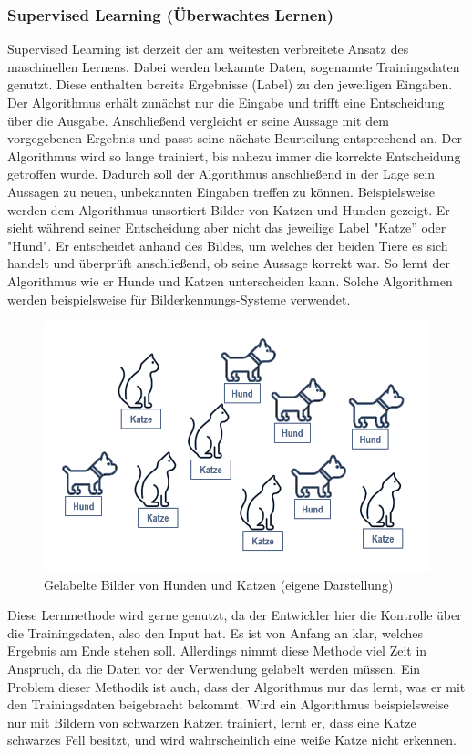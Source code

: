 \documentclass[a4paper,12pt, german]{report}
\begin{document}
\subsubsection{Supervised Learning (Überwachtes Lernen)} 

Supervised Learning ist derzeit der am weitesten verbreitete Ansatz des maschinellen Lernens. Dabei werden bekannte Daten, sogenannte Trainingsdaten genutzt. Diese enthalten bereits Ergebnisse (Label) zu den jeweiligen Eingaben. Der Algorithmus erhält zunächst nur die Eingabe und trifft eine Entscheidung über die Ausgabe. Anschließend vergleicht er seine Aussage mit dem vorgegebenen Ergebnis und passt seine nächste Beurteilung entsprechend an. Der Algorithmus wird so lange trainiert, bis nahezu immer die korrekte Entscheidung getroffen wurde. Dadurch soll der Algorithmus anschließend in der Lage sein Aussagen zu neuen, unbekannten Eingaben treffen zu können.\cite{01}\cite{05} \newline
Beispielsweise werden dem Algorithmus unsortiert Bilder von Katzen und Hunden gezeigt. Er sieht während seiner Entscheidung aber nicht das jeweilige Label "Katze'' oder "Hund". Er entscheidet anhand des Bildes, um welches der beiden Tiere es sich handelt und überprüft anschließend, ob seine Aussage korrekt war. So lernt der Algorithmus wie er Hunde und Katzen unterscheiden kann. Solche Algorithmen werden beispielsweise für Bilderkennungs-Systeme verwendet. 
\begin{figure}[H]
  \center
  \includegraphics[width=12cm]{images/supervised.png}
  \caption[Gelabelte Bilder von Hunden und Katzen]{Gelabelte Bilder von Hunden und Katzen (eigene Darstellung)}
\end{figure}

Diese Lernmethode wird gerne genutzt, da der Entwickler hier die Kontrolle über die Trainingsdaten, also den Input hat. Es ist von Anfang an klar, welches Ergebnis am Ende stehen soll. Allerdings nimmt diese Methode viel Zeit in Anspruch, da die Daten vor der Verwendung gelabelt werden müssen. Ein Problem dieser Methodik ist auch, dass der Algorithmus nur das lernt, was er mit den Trainingsdaten beigebracht bekommt. Wird ein Algorithmus beispielsweise nur mit Bildern von schwarzen Katzen trainiert, lernt er, dass eine Katze schwarzes Fell besitzt, und wird wahrscheinlich eine weiße Katze nicht erkennen.
\end{document}
